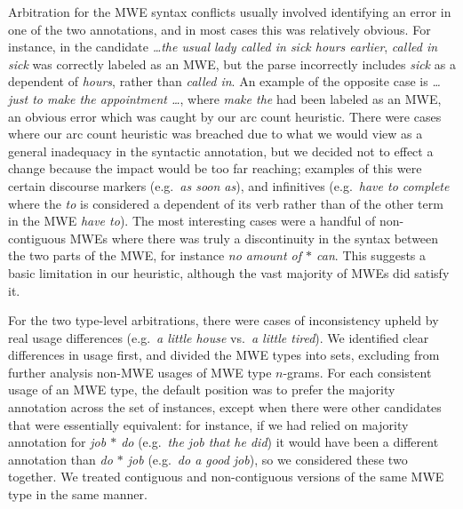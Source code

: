 \documentclass[output=paper
,modfonts
,nonflat]{langsci/langscibook}
\newcommand{\lex}[1]{\textit{#1}\xspace}
\newcommand{\ngram}[1][]{$n$-gram{#1}\xspace}
\newcommand{\gap}{$*$\xspace}
\begin{document}
Arbitration for the MWE syntax conflicts usually involved identifying an error in one of the two annotations, and in most cases this was relatively obvious. For instance, in the candidate \lex{\ldots the usual lady called in sick hours earlier}, \lex{called in sick} was correctly labeled as an MWE, but the parse incorrectly includes \lex{sick} as a dependent of \lex{hours}, rather than \lex{called in}. An example of the opposite case is \lex{\ldots just to make the appointment \ldots}, where  \lex{make the} had been labeled as an MWE, an obvious error which was caught by our arc count heuristic. There were cases where our arc count heuristic was breached due to what we would view as a general inadequacy in the syntactic annotation, but we decided not to effect a change because the impact would be too far reaching; examples of this were certain discourse markers (e.g.\ \lex{as soon as}), and infinitives (e.g.\ \lex{have to complete} where the \lex{to} is considered a dependent of its verb rather than of the other term in the MWE \lex{have to}). The most interesting cases were a handful of non-contiguous MWEs where there was truly a discontinuity in the syntax between the two parts of the MWE, for instance \lex{no amount of \gap can}. This suggests a basic limitation in our heuristic, although the vast majority of MWEs did satisfy it.

For the two type-level arbitrations, there were cases of inconsistency upheld by real usage differences (e.g.\ \lex{a little house} vs.\ \lex{a little tired}). We identified clear differences in usage first, and divided the MWE types into sets, excluding from further analysis non-MWE usages of MWE type \ngram[s]. For each consistent usage of an MWE type, the default position was to prefer the majority annotation across the set of instances, except when there were other candidates that were essentially equivalent: for instance, if we had relied on majority annotation for \lex{job \gap do} (e.g.\ \lex{the job that he did}) it would have been a different annotation than \lex{do \gap job} (e.g.\ \lex{do a good job}), so we considered these two together. We treated contiguous and non-contiguous versions of the same MWE type in the same manner.
\end{document}
